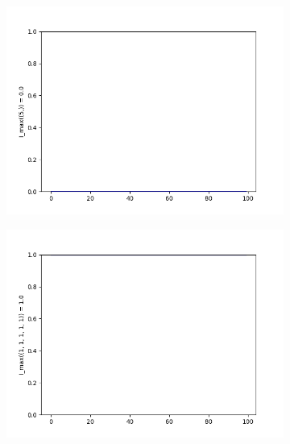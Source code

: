 \documentclass{llncs}
\begin{document}
\begin{figure}
\begin{subfigure}{0.5\linewidth}
\centering\includegraphics[scale=0.4]{images/1-max-consistent-partitions.png}\hfill
\end{subfigure}
\begin{subfigure}{0.5\linewidth}
\centering\includegraphics[scale=0.4]{images/1-1-1-1-1-max-consistent-partitions.png}
\end{subfigure}
\end{figure}
\end{document}
